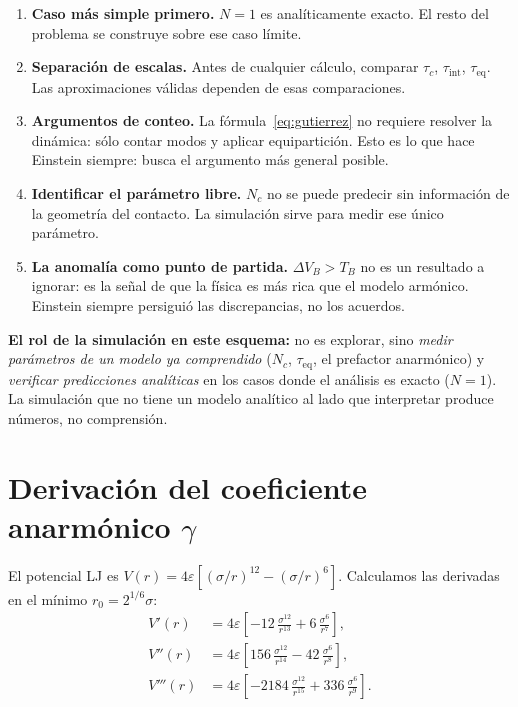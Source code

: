 \documentclass[11pt, a4paper]{article}
\begin{document}
\begin{enumerate}
  \item \textbf{Caso más simple primero.} $N=1$ es analíticamente exacto.
        El resto del problema se construye sobre ese caso límite.

  \item \textbf{Separación de escalas.} Antes de cualquier cálculo,
        comparar $\tau_c$, $\tau_\text{int}$, $\tau_\text{eq}$.
        Las aproximaciones válidas dependen de esas comparaciones.

  \item \textbf{Argumentos de conteo.} La fórmula~\eqref{eq:gutierrez}
        no requiere resolver la dinámica: sólo contar modos y aplicar
        equipartición. Esto es lo que hace Einstein siempre: busca el
        argumento más general posible.

  \item \textbf{Identificar el parámetro libre.} $N_c$ no se puede
        predecir sin información de la geometría del contacto. La
        simulación sirve para medir ese único parámetro.

  \item \textbf{La anomalía como punto de partida.} $\Delta V_B > T_B$
        no es un resultado a ignorar: es la señal de que la física es
        más rica que el modelo armónico. Einstein siempre persiguió las
        discrepancias, no los acuerdos.
\end{enumerate}

\begin{mdframed}[style=resultado]
\textbf{El rol de la simulación en este esquema:} no es explorar, sino
\emph{medir parámetros de un modelo ya comprendido} ($N_c$, $\tau_\text{eq}$,
el prefactor anarmónico) y \emph{verificar predicciones analíticas} en los
casos donde el análisis es exacto ($N=1$). La simulación que no tiene
un modelo analítico al lado que interpretar produce números, no comprensión.
\end{mdframed}

\appendix
\section{Derivación del coeficiente anarmónico \texorpdfstring{$\gamma$}{γ}}

El potencial LJ es $V(r) = 4\varepsilon[(\sigma/r)^{12} - (\sigma/r)^6]$.
Calculamos las derivadas en el mínimo $r_0 = 2^{1/6}\sigma$:
\begin{align}
  V'(r)   &= 4\varepsilon\left[-12\,\frac{\sigma^{12}}{r^{13}}
              + 6\,\frac{\sigma^6}{r^7}\right], \\
  V''(r)  &= 4\varepsilon\left[156\,\frac{\sigma^{12}}{r^{14}}
              - 42\,\frac{\sigma^6}{r^8}\right], \\
  V'''(r) &= 4\varepsilon\left[-2184\,\frac{\sigma^{12}}{r^{15}}
              + 336\,\frac{\sigma^6}{r^9}\right].
\end{align}
\end{document}
